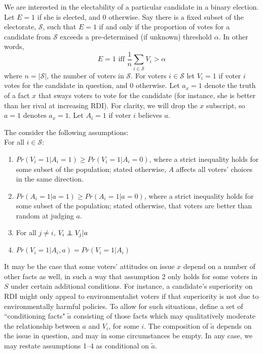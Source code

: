 \documentclass[11pt]{article}
\def\independenT#1#2{\mathrel{\rlap{$#1#2$}\mkern2mu{#1#2}}}
\newcommand\independent{\protect\mathpalette{\protect\independenT}{\perp}}
\begin{document}
We are interested in the electability of a particular candidate in a binary election. Let $E=1$ if she is elected, and 0 otherwise.
Say there is a fixed subset of the electorate, $\mathcal{S}$, such that $E=1$ if and only if the proportion of votes for a candidate from $\mathcal{S}$ exceeds a pre-determined (if unknown) threshold $\alpha$. In other words,
\begin{equation}
E =1 \text{ iff } \frac{1}{n} \sum_{i\in \mathcal{S}} V_i>\alpha
\end{equation}
where $n=|\mathcal{S}|$, the number of voters in $\mathcal{S}$. 
For voters $i\in \mathcal{S}$ let $V_i=1$ if voter $i$ votes for the candidate in question, and 0 otherwise.
Let $a_x=1$ denote the truth of a fact $x$ that sways voters to vote for the candidate (for instance, she is better than her rival at increasing RDI).
For clarity, we will drop the $x$ subscript, so $a=1$ denotes $a_x=1$.
Let $A_i=1$ if voter $i$ believes $a$.

The consider the following assumptions:\\
For all $i\in\mathcal{S}$:
\begin{enumerate}
\item $Pr(V_i=1|A_i=1)\ge Pr(V_i=1|A_i=0)$, where a strict inequality holds for some subset of the population; stated otherwise, $A$ affects all voters' choices in the same direction.
\item $Pr(A_i=1|a=1)\ge Pr(A_i=1|a=0)$, where a strict inequality holds for some subset of the population; stated otherwise, that voters are better than random at judging $a$.
\item For all $j\ne i$, $V_i \independent V_j|a$
\item $Pr(V_i=1|A_i, a)=Pr(V_i=1|A_i)$
\end{enumerate}

It may be the case that some voters' attitudes on issue $x$ depend on a number of other facts as well,  in such a way that assumption 2 only holds for some voters in $S$ under certain additional conditions.
For instance, a candidate's superiority on RDI might only appeal to environmentalist voters if that superiority is not due to environmentally harmful policies. 
To allow for such situations, define a set of ``conditioning facts" $\tilde{a}$ consisting of those facts which may qualitatively moderate the relationship between $a$ and $V_i$, for some $i$.
The composition of $\tilde{a}$ depends on the issue in question, and may in some circumstances be empty.
In any case, we may restate assumptions 1--4 as conditional on $\tilde{a}$.
\end{document}
